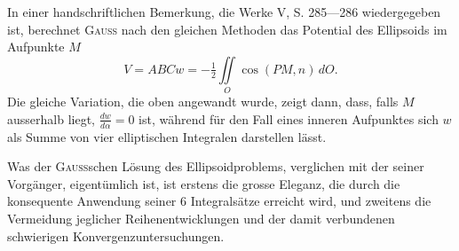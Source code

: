 In einer handschriftlichen Bemerkung, die Werke V, S. 285—286 wiedergegeben
ist, berechnet \textsc{Gauss} nach den gleichen Methoden das Potential des
Ellipsoids im Aufpunkte \(M\)
\[
V=ABCw=-\tfrac12\iint\limits_O\cos(PM,n)\,dO.
\]
\noindent Die gleiche Variation, die oben angewandt wurde, zeigt dann, dass, falls \(M\)
ausserhalb liegt, \(\frac{dw}{d\alpha}=0\) ist, während für den Fall eines inneren Aufpunktes
sich \(w\) als Summe von vier elliptischen Integralen darstellen lässt.

Was der \textsc{Gauss}schen Lösung des Ellipsoidproblems, verglichen mit der
seiner Vorgänger, eigentümlich ist, ist erstens die grosse Eleganz, die durch
die konsequente Anwendung seiner 6 Integralsätze erreicht wird, und zweitens
die Vermeidung jeglicher Reihenentwicklungen und der damit verbundenen
schwierigen Konvergenzuntersuchungen.
\clearpage\endgroup
